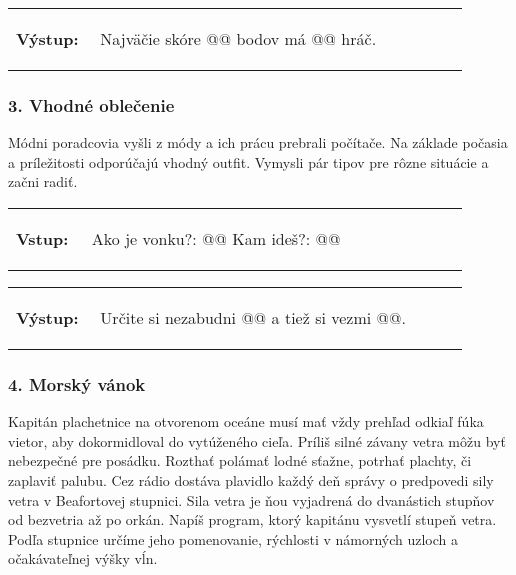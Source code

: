 \vspace{-2em}
\begin{tabular}{@{}p{0.15\linewidth}p{0.75\linewidth}}
\textbf{\small Výstup:} &
\vspace{-3em}
\begin{code}
Najväčie skóre @\fbox{\phantom{vstup}}@ bodov má @\fbox{\phantom{vstup}}@ hráč.
\end{code}
\end{tabular}
\vspace{-2em}


\subsubsection*{3. Vhodné oblečenie}
Módni poradcovia vyšli z módy a ich prácu prebrali počítače. Na základe počasia a príležitosti odporúčajú vhodný outfit. Vymysli pár tipov pre rôzne situácie a začni radiť.

\begin{tabular}{@{}p{0.15\linewidth}p{0.75\linewidth}}
\textbf{\small Vstup:} &
\vspace{-3em}
\begin{code}
Ako je vonku?: @\fbox{\phantom{vstup}}@
Kam ideš?: @\fbox{\phantom{vstup}}@
\end{code}
\end{tabular}

\vspace{-2em}
\begin{tabular}{@{}p{0.15\linewidth}p{0.75\linewidth}}
\textbf{\small Výstup:} &
\vspace{-3em}
\begin{code}
Určite si nezabudni @\fbox{\phantom{vstup}}@ a tiež si vezmi @\fbox{\phantom{vstup}}@.
\end{code}
\end{tabular}
\vspace{-2em}

\subsubsection*{4. Morský vánok}
Kapitán plachetnice na otvorenom oceáne musí mať vždy prehľad odkiaľ fúka vietor, aby dokormidloval do vytúženého cieľa. Príliš silné závany vetra môžu byť nebezpečné pre posádku. Rozthať polámať lodné sťažne, potrhať plachty, či zaplaviť palubu. Cez rádio dostáva plavidlo každý deň správy o predpovedi sily vetra v Beafortovej stupnici. Sila vetra je ňou vyjadrená do dvanástich stupňov od bezvetria až po orkán. Napíš program, ktorý kapitánu vysvetlí stupeň vetra. Podľa stupnice určíme jeho pomenovanie, rýchlosti v námorných uzloch a očakávateľnej výšky vĺn.

